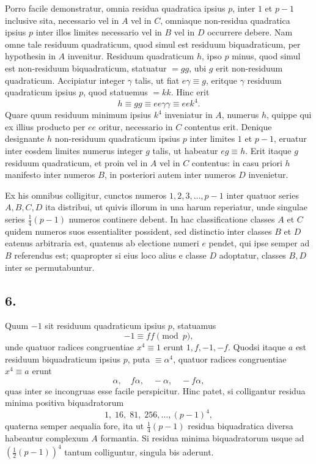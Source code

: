 \documentclass[12pt]{article}
\begin{document}
Porro facile demonstratur, omnia residua quadratica ipsius $p$, inter $1$ et $p-1$ inclusive sita, necessario vel in $A$ vel in $C$, omniaque non-residua quadratica ipsius $p$ inter illos limites necessario vel in $B$ vel in $D$ occurrere debere. Nam omne tale residuum quadraticum, quod simul est residuum biquadraticum, per hypothesin in $A$ invenitur. Residuum quadraticum $h$, ipso $p$ minus, quod simul est non-residuum biquadraticum, statuatur $=gg$, ubi $g$ erit non-residuum quadraticum. Accipiatur integer $\gamma$ talis, ut fiat $e\gamma\equiv g$, eritque $\gamma$ residuum quadraticum ipsius $p$, quod statuemus $=kk$. Hinc erit
\[
h\equiv gg\equiv ee\gamma\gamma\equiv ee k^4.
\]
Quare quum residuum minimum ipsius $k^4$ inveniatur in $A$, numerus $h$, quippe qui ex illius producto per $ee$ oritur, necessario in $C$ contentus erit. Denique designante $h$ non-residuum quadraticum ipsius $p$ inter limites $1$ et $p-1$, eruatur inter eosdem limites numerus integer $g$ talis, ut habeatur $eg\equiv h$. Erit itaque $g$ residuum quadraticum, et proin vel in $A$ vel in $C$ contentus: in casu priori $h$ manifesto inter numeros $B$, in posteriori autem inter numeros $D$ invenietur.

Ex his omnibus colligitur, cunctos numeros $1,2,3,\ldots,p-1$ inter quatuor series $A,B,C,D$ ita distribui, ut quivis illorum in una harum reperiatur, unde singulae series $\frac14(p-1)$ numeros continere debent. In hac classificatione classes $A$ et $C$ quidem numeros suos essentialiter possident, sed distinctio inter classes $B$ et $D$ eatenus arbitraria est, quatenus ab electione numeri $e$ pendet, qui ipse semper ad $B$ referendus est; quapropter si eius loco alius e classe $D$ adoptatur, classes $B,D$ inter se permutabuntur.

\subsection*{6.}

Quum $-1$ sit residuum quadraticum ipsius $p$, statuamus
\[
-1\equiv ff\pmod p,
\]
unde quatuor radices congruentiae $x^4\equiv1$ erunt $1,f,-1,-f$. Quodsi itaque $a$ est residuum biquadraticum ipsius $p$, puta $\equiv \alpha^4$, quatuor radices congruentiae $x^4\equiv a$ erunt
\[
\alpha,\quad f\alpha,\quad -\alpha,\quad -f\alpha,
\]
quas inter se incongruas esse facile perspicitur. Hinc patet, si colligantur residua minima positiva biquadratorum
\[
1,\;16,\;81,\;256,\ldots,(p-1)^4,
\]
quaterna semper aequalia fore, ita ut $\frac14(p-1)$ residua biquadratica diversa habeantur complexum $A$ formantia. Si residua minima biquadratorum usque ad $\left(\frac12(p-1)\right)^4$ tantum colliguntur, singula bis aderunt.
\end{document}
